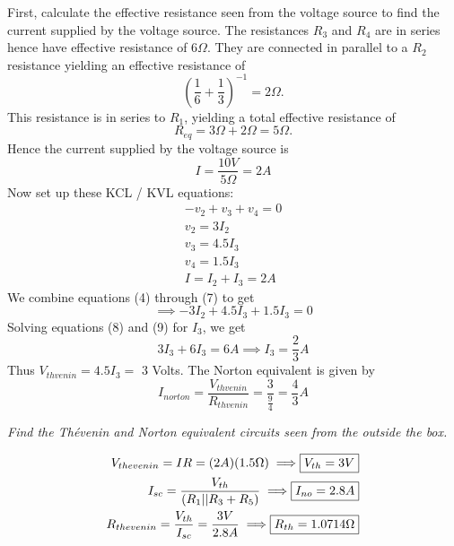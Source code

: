 \documentclass[letter]{article}
\newenvironment{menumerate}{%
  \edef\backupindent{\the\parindent}%
  \enumerate%
  \setlength{\parindent}{\backupindent}%
}{\endenumerate}
\begin{document}
\begin{menumerate}
\begin{menumerate}
        First, calculate the effective resistance seen from the voltage source to find the current supplied by the voltage source. The resistances $R_3$ and $R_4$ are in series hence have effective resistance of $6\Omega$. They are connected in parallel to a $R_2$ resistance yielding an effective resistance of
        \begin{equation}
          (\frac{1}{6} + \frac{1}{3})^{-1} = 2\Omega.
        \end{equation}
        This resistance is in series to $R_1$, yielding a total effective resistance of
        \begin{equation}
            R_{eq} = 3\Omega + 2\Omega = 5\Omega.
        \end{equation}
        Hence the current supplied by the voltage source is
        \begin{equation}
            I = \frac{10V}{5\Omega} = 2A
        \end{equation}
        Now set up these KCL / KVL equations:
        \begin{align}
            -v_2 + v_3 + v_4 = 0 \\ v_2 = 3I_2 \\ v_3 = 4.5I_3 \\ v_4 = 1.5I_3 \\ I = I_2 + I_3 = 2A
        \end{align}
        We combine equations (4) through (7) to get
        \begin{equation}
            \implies -3I_2 + 4.5I_3 + 1.5I_3 = 0
        \end{equation}
        Solving equations (8) and (9) for $I_3$, we get
        \begin{equation}
            3I_3 + 6I_3 = 6A \implies I_3 = \frac{2}{3}A
        \end{equation}
        Thus $V_{thvenin} = 4.5I_3 =$ 3 Volts.
        The Norton equivalent is given by
        \begin{equation}
            I_{norton} = \frac{V_{thvenin}}{R_{thvenin}} = \frac{3}{\frac{9}{4}} = \frac{4}{3}A
        \end{equation}
        \item \emph{Find the Thévenin and Norton equivalent circuits seen from the outside the box.}

        \begin{align}
            V_{thevenin} = IR = (2A)(1.5\Omega) \implies \Aboxed{V_{th} = 3V} \\
            I_{sc} = \frac{V_{th}}{(R_1 || R_3 + R_5)} \implies \Aboxed{I_{no} = 2.8A} \\
            R_{thevenin} = \frac{V_{th}}{I_{sc}} = \frac{3V}{2.8A} \implies \Aboxed{R_{th} = 1.0714\Omega}
        \end{align}
    \end{menumerate}


\end{menumerate}
\end{document}
